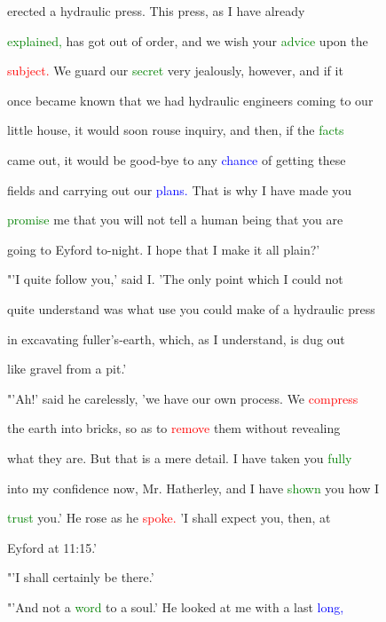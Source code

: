  erected a hydraulic press. This press, as I have already

 \textcolor{green}{explained,} has got out of order, and we wish your \textcolor{green}{advice} upon the

 \textcolor{red}{subject.} We \textcolor{BurntOrange}{guard} our \textcolor{green}{secret} very jealously, however, and if it

 once became known that we had hydraulic engineers coming to our

 little house, it would soon rouse \textcolor{BurntOrange}{inquiry,} and then, if the \textcolor{green}{facts}

 came out, it would be good-bye to any \textcolor{blue}{chance} of getting these

 fields and carrying out our \textcolor{blue}{plans.} That is why I have made you

 \textcolor{green}{promise} me that you will not tell a human being that you are

 going to Eyford to-night. I \textcolor{BurntOrange}{hope} that I make it all plain?'



 "'I quite follow you,' said I. 'The only point which I could not

 quite understand was what use you could make of a hydraulic press

 in excavating fuller's-earth, which, as I understand, is dug out

 like gravel from a pit.'



 "'Ah!' said he carelessly, 'we have our own process. We \textcolor{red}{compress}

 the earth into bricks, so as to \textcolor{red}{remove} them without revealing

 what they are. But that is a mere detail. I have taken you \textcolor{green}{fully}

 into my \textcolor{BurntOrange}{confidence} now, Mr. Hatherley, and I have \textcolor{green}{shown} you how I

 \textcolor{green}{trust} you.' He rose as he \textcolor{red}{spoke.} 'I shall \textcolor{BurntOrange}{expect} you, then, at

 Eyford at 11:15.'



 "'I shall certainly be there.'



 "'And not a \textcolor{green}{word} to a soul.' He looked at me with a last \textcolor{blue}{long,}

